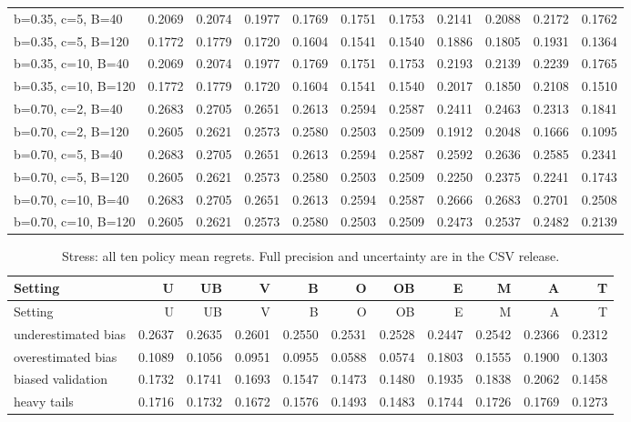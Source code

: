 \begin{landscape}
\begin{longtable}{lrrrrrrrrrr}
b=0.35, c=5, B=40 & 0.2069 & 0.2074 & 0.1977 & 0.1769 & 0.1751 & 0.1753 & 0.2141 & 0.2088 & 0.2172 & 0.1762 \\
b=0.35, c=5, B=120 & 0.1772 & 0.1779 & 0.1720 & 0.1604 & 0.1541 & 0.1540 & 0.1886 & 0.1805 & 0.1931 & 0.1364 \\
b=0.35, c=10, B=40 & 0.2069 & 0.2074 & 0.1977 & 0.1769 & 0.1751 & 0.1753 & 0.2193 & 0.2139 & 0.2239 & 0.1765 \\
b=0.35, c=10, B=120 & 0.1772 & 0.1779 & 0.1720 & 0.1604 & 0.1541 & 0.1540 & 0.2017 & 0.1850 & 0.2108 & 0.1510 \\
b=0.70, c=2, B=40 & 0.2683 & 0.2705 & 0.2651 & 0.2613 & 0.2594 & 0.2587 & 0.2411 & 0.2463 & 0.2313 & 0.1841 \\
b=0.70, c=2, B=120 & 0.2605 & 0.2621 & 0.2573 & 0.2580 & 0.2503 & 0.2509 & 0.1912 & 0.2048 & 0.1666 & 0.1095 \\
b=0.70, c=5, B=40 & 0.2683 & 0.2705 & 0.2651 & 0.2613 & 0.2594 & 0.2587 & 0.2592 & 0.2636 & 0.2585 & 0.2341 \\
b=0.70, c=5, B=120 & 0.2605 & 0.2621 & 0.2573 & 0.2580 & 0.2503 & 0.2509 & 0.2250 & 0.2375 & 0.2241 & 0.1743 \\
b=0.70, c=10, B=40 & 0.2683 & 0.2705 & 0.2651 & 0.2613 & 0.2594 & 0.2587 & 0.2666 & 0.2683 & 0.2701 & 0.2508 \\
b=0.70, c=10, B=120 & 0.2605 & 0.2621 & 0.2573 & 0.2580 & 0.2503 & 0.2509 & 0.2473 & 0.2537 & 0.2482 & 0.2139 \\
\bottomrule
\end{longtable}
\small
{}
\begin{longtable}{lrrrrrrrrrr}
\caption{Stress: all ten policy mean regrets. Full precision and uncertainty are in the CSV release.}\\
\toprule
Setting & U & UB & V & B & O & OB & E & M & A & T \\
\midrule
\endfirsthead
\toprule
Setting & U & UB & V & B & O & OB & E & M & A & T \\
\midrule
\endhead
underestimated bias & 0.2637 & 0.2635 & 0.2601 & 0.2550 & 0.2531 & 0.2528 & 0.2447 & 0.2542 & 0.2366 & 0.2312 \\
overestimated bias & 0.1089 & 0.1056 & 0.0951 & 0.0955 & 0.0588 & 0.0574 & 0.1803 & 0.1555 & 0.1900 & 0.1303 \\
biased validation & 0.1732 & 0.1741 & 0.1693 & 0.1547 & 0.1473 & 0.1480 & 0.1935 & 0.1838 & 0.2062 & 0.1458 \\
heavy tails & 0.1716 & 0.1732 & 0.1672 & 0.1576 & 0.1493 & 0.1483 & 0.1744 & 0.1726 & 0.1769 & 0.1273 \\

\end{longtable}
\end{landscape}

